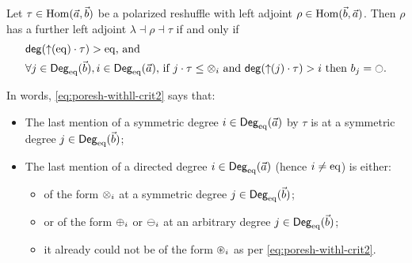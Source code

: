 \documentclass[a4paper]{memoir}
\begin{document}
\begin{theorem} \label{thm:poresh-withll}
	Let $\tau \in {\mathrm{Hom}}(\vec a, \vec b)$ be a polarized reshuffle with left adjoint $\rho \in {\mathrm{Hom}}(\vec b, \vec a)$.
	Then $\rho$ has a further left adjoint $\lambda \dashv \rho \dashv \tau$ if and only if
	\begin{align}
		&\text{$\getdeg(\sucdeg(\eqtydeg) \cdot \tau) > \eqtydeg$, and} \label{eq:poresh-withll-crit1} \\
		&\text{$\forall j \in \Degeq(\vec b), i \in \Degeq(\vec a)$, if $j \cdot \tau \leq \mixpol_i$ and $\getdeg(\sucdeg(j) \cdot \tau) > i$ then $b_j = \npolar$.} \label{eq:poresh-withll-crit2}
	\end{align}
\end{theorem}
In words, \cref{eq:poresh-withll-crit2} says that:
\begin{itemize}
	\item The last mention of a symmetric degree $i \in {\mathsf{Deg}_{\mathrm{eq}}}(\vec a)$ by $\tau$ is at a symmetric degree $j \in {\mathsf{Deg}_{\mathrm{eq}}}(\vec b)$;
	\item The last mention of a directed degree $i \in {\mathsf{Deg}_{\mathrm{eq}}}(\vec a)$ (hence $i \neq {\mathrm{eq}}$) is either:
	\begin{itemize}
		\item of the form ${\otimes}_i$ at a symmetric degree $j \in {\mathsf{Deg}_{\mathrm{eq}}}(\vec b)$;
		\item or of the form ${\oplus}_i$ or ${\ominus}_i$ at an arbitrary degree $j \in {\mathsf{Deg}_{\mathrm{eq}}}(\vec b)$;
		\item it already could not be of the form ${\oast}_i$ as per \cref{eq:poresh-withl-crit2}.
	\end{itemize}
\end{itemize}
\end{document}
